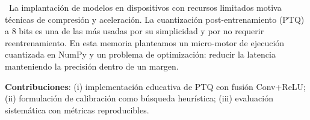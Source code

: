 \
        La implantación de modelos en dispositivos con recursos limitados motiva técnicas
        de compresión y aceleración. La cuantización post-entrenamiento (PTQ) a 8 bits es
        una de las más usadas por su simplicidad y por no requerir reentrenamiento.
        En esta memoria planteamos un micro-motor de ejecución cuantizada en NumPy y
        un problema de optimización: reducir la latencia manteniendo la precisión dentro de un margen.

        \textbf{Contribuciones}:
        (i) implementación educativa de PTQ con fusión Conv+ReLU;
        (ii) formulación de calibración como búsqueda heurística;
        (iii) evaluación sistemática con métricas reproducibles.
